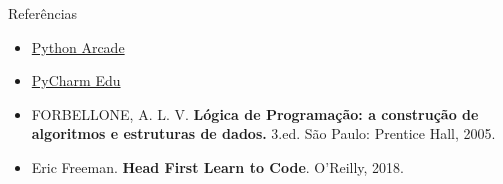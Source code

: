 \documentclass{beamer}
\begin{document}
\begin{frame}{Referências}
 
 \begin{itemize}
  \item \vfill \href{https://arcade-book.readthedocs.io}{Python Arcade}
  \item \vfill \href{https://www.jetbrains.com/pycharm-edu/}{PyCharm Edu}
  \item \vfill FORBELLONE, A. L. V. \textbf{Lógica de Programação: a construção de algoritmos e estruturas de dados.} 3.ed. São Paulo: Prentice Hall, 2005.
  \item \vfill  Eric Freeman. \textbf{Head First Learn to Code}. O'Reilly, 2018.

 \end{itemize}

 
\end{frame}
\end{document}
